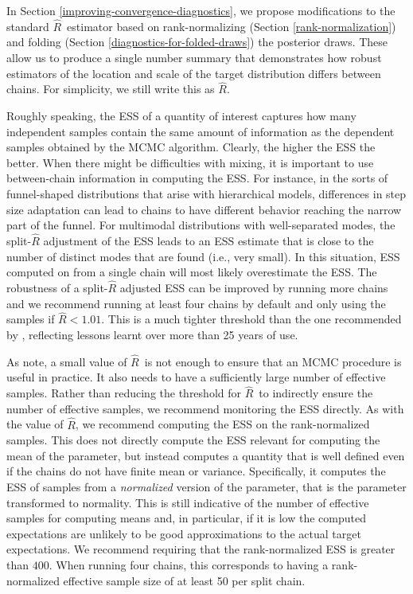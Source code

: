 \documentclass[american,]{article}
\newcommand{\Rhat}{$\widehat{R}$}
\theoremstyle{definition}
\begin{document}
In Section \ref{improving-convergence-diagnostics}, we propose modifications to the 
standard \Rhat\ estimator based on rank-normalizing (Section 
\ref{rank-normalization}) and folding (Section
 \ref{diagnostics-for-folded-draws}) the posterior draws.
These allow us to produce a single number summary  that demonstrates how
 robust estimators of the location and scale of the target distribution differs
 between chains.  For simplicity, we still write this as \Rhat .
 
Roughly speaking, the ESS of a quantity of interest captures how many 
independent samples contain the same amount of information as the dependent 
samples obtained by the MCMC algorithm. Clearly, the higher the ESS the better.
When there might be difficulties with mixing, it is important to use between-chain 
information in computing the ESS. For instance, in the sorts of
funnel-shaped distributions that arise with hierarchical models, differences 
in step size adaptation can lead to chains to have
different behavior reaching the narrow part of the funnel. For multimodal 
distributions with well-separated modes, the split-\(\widehat{R}\)
adjustment of the ESS leads to an ESS estimate that is close to the number of
distinct modes that are found (i.e., very small). 
In this situation, ESS computed on from a single chain will most likely 
overestimate the ESS. The robustness of a split-\(\widehat{R}\) adjusted
ESS can be improved by running more chains and we recommend running at least 
four chains by default and only using the samples if  $\widehat{R} < 1.01$. 
This is a much tighter threshold than the one recommended by 
\citet{Gelman+Rubin:1992}, reflecting lessons learnt over more than 25 years of use.

As \citet{vats2018revisiting} note, a small value of \Rhat\ is not enough to ensure 
that an MCMC procedure is useful in practice. It also needs to have a sufficiently
large number of effective samples. Rather than reducing the threshold for \Rhat\
to indirectly ensure the number of effective samples, we recommend monitoring
the ESS directly. As with the value of \Rhat, we 
recommend computing the ESS on the rank-normalized samples. This does not
directly compute the ESS relevant for computing the mean of the parameter, but 
instead computes a quantity that is well defined even if the chains do not 
have finite mean or variance.  Specifically, it computes the ESS of samples 
from a \emph{normalized} version of the parameter, that is the parameter 
transformed to normality. This is still indicative of the number of effective 
samples for computing means and, in particular, if it is low the computed
expectations are unlikely to be good approximations to the actual
target expectations.  We recommend requiring that the rank-normalized ESS is 
 greater than $400$. When running four chains, this corresponds to having
a rank-normalized effective sample size of at least 50 per split chain.
\end{document}
